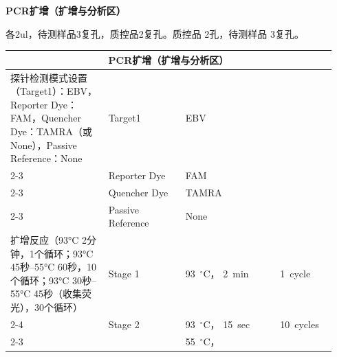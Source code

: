 \documentclass[UTF8,10pt,a4paper,fontset=fandol]{ctexart}
\newcommand{\fieldvalue}[1]{#1}
\begin{document}

\newpage

\begin{center}
\textbf{PCR扩增（扩增与分析区）}
\end{center}

\noindent
各2ul，待测样品3复孔，质控品2复孔。质控品
\fieldvalue{2}孔，待测样品
\fieldvalue{3}复孔。

\medskip

\begin{tabular}{|p{0.29\linewidth}|p{0.22\linewidth}|p{0.27\linewidth}|p{0.16\linewidth}|}
\hline
\multicolumn{4}{|c|}{PCR扩增（扩增与分析区）}\\
\hline
\multicolumn{1}{|p{0.29\linewidth}|}{探针检测模式设置（Target1）：EBV，Reporter Dye：FAM，Quencher Dye：TAMRA（或None），Passive Reference：None}
&
\multicolumn{1}{|p{0.22\linewidth}|}{Target1}
&
\fieldvalue{EBV}
&
\\[-1.2ex]
\cline{2-3}
&
Reporter Dye
&
\fieldvalue{FAM}
&
\\[-1.2ex]
\cline{2-3}
&
Quencher Dye
&
\fieldvalue{TAMRA}
&
\\[-1.2ex]
\cline{2-3}
&
Passive Reference
&
\fieldvalue{None}
&
\\
\hline
\multicolumn{1}{|p{0.29\linewidth}|}{扩增反应（93°C 2分钟，1个循环；93°C 45秒--55°C 60秒，10个循环；93°C 30秒--55°C 45秒（收集荧光），30个循环）}
&
Stage 1
&
\fieldvalue{93}~$^\circ$C， 
\fieldvalue{2}~min
&
\fieldvalue{1}~cycle
\\
\cline{2-4}
&
Stage 2
&
\fieldvalue{93}~$^\circ$C，
\fieldvalue{15}~sec
&
\fieldvalue{10}~cycles
\\
\cline{2-3}
&
&
\fieldvalue{55}~$^\circ$C，

\end{tabular}
\end{document}
